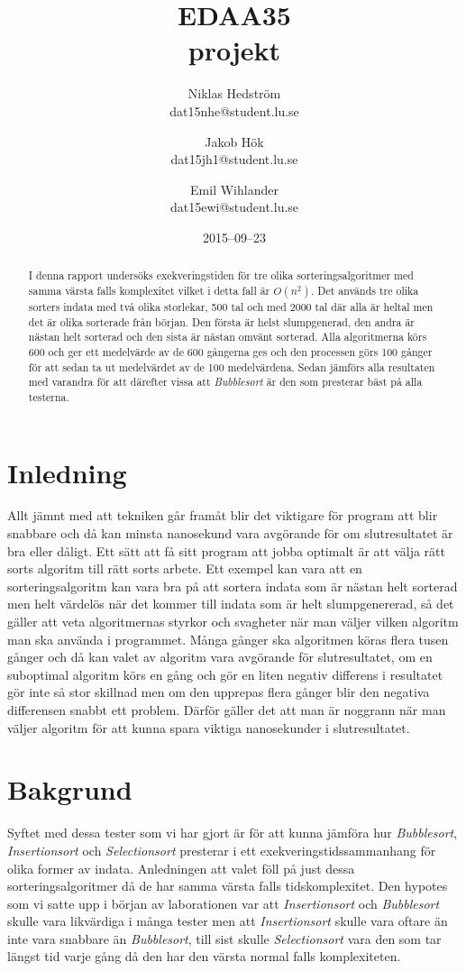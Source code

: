 \documentclass[a4paper]{article}
\title{EDAA35\\ projekt}
\author{Niklas Hedström \\dat15nhe@student.lu.se\and
	    Jakob Hök \\ dat15jh1@student.lu.se \and
	    Emil Wihlander\\ dat15ewi@student.lu.se}
\date{2015--09--23}
\begin{document}
\maketitle

\begin{abstract}
	I denna rapport undersöks exekveringstiden för tre olika sorteringsalgoritmer med samma värsta falls komplexitet vilket i detta fall är $O(n^2)$. Det används tre olika sorters indata med två olika storlekar, 500 tal och med 2000 tal där alla är heltal men det är olika sorterade från början. Den första är helst slumpgenerad, den andra är nästan helt sorterad och den sista är nästan omvänt sorterad. Alla algoritmerna körs 600 och ger ett medelvärde av de 600 gångerna ges och den processen görs 100 gånger för att sedan ta ut medelvärdet av de 100 medelvärdena. Sedan jämförs alla resultaten med varandra för att därefter vissa att \emph{Bubblesort} är den som presterar bäst på alla testerna.
\end{abstract}

\pagebreak

\section{Inledning}
Allt jämnt med att tekniken går framåt blir det viktigare för program att blir snabbare och då kan minsta nanosekund vara avgörande för om slutresultatet är bra eller dåligt. Ett sätt att få sitt program att jobba optimalt är att välja rätt sorts algoritm till rätt sorts arbete. Ett exempel kan vara att en sorteringsalgoritm kan vara bra på att sortera indata som är nästan helt sorterad men helt värdelös när det kommer till indata som är helt slumpgenererad, så det gäller att veta algoritmernas styrkor och svagheter när man väljer vilken algoritm man ska använda i programmet. Många gånger ska algoritmen köras flera tusen gånger och då kan valet av algoritm vara avgörande för slutresultatet, om en suboptimal algoritm körs en gång och gör en liten negativ differens i resultatet gör inte så stor skillnad men om den upprepas flera gånger blir den negativa differensen snabbt ett problem. Därför gäller det att man är noggrann när man väljer algoritm för att kunna spara viktiga nanosekunder i slutresultatet. 

\section{Bakgrund}
Syftet med dessa tester som vi har gjort är för att kunna jämföra hur \emph{Bubblesort}, \emph{Insertionsort} och \emph{Selectionsort} presterar i ett exekveringstidssammanhang för olika former av indata. Anledningen att valet föll på just dessa sorteringsalgoritmer då de har samma värsta falls tidskomplexitet. Den hypotes som vi satte upp i början av laborationen var att \emph{Insertionsort} och \emph{Bubblesort} skulle vara likvärdiga i många tester men att \emph{Insertionsort} skulle vara oftare än inte vara snabbare än \emph{Bubblesort}, till sist skulle \emph{Selectionsort} vara den som tar längst tid varje gång då den har den värsta normal falls komplexiteten.\cite{sortingAlgoritm}
\end{document}
